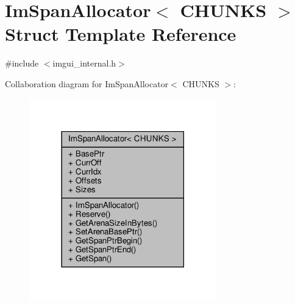 \hypertarget{structImSpanAllocator}{}\section{Im\+Span\+Allocator$<$ C\+H\+U\+N\+KS $>$ Struct Template Reference}
\label{structImSpanAllocator}


{\ttfamily \#include $<$imgui\+\_\+internal.\+h$>$}



Collaboration diagram for Im\+Span\+Allocator$<$ C\+H\+U\+N\+KS $>$\+:
\nopagebreak
\begin{figure}[H]
\begin{center}
\leavevmode
\includegraphics[width=230pt]{structImSpanAllocator__coll__graph}
\end{center}
\end{figure}
